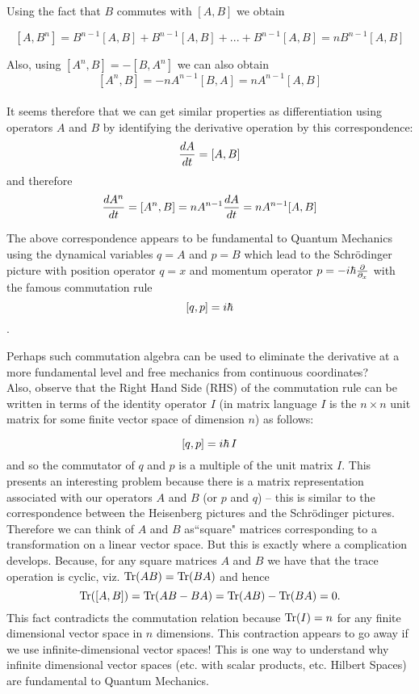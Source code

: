 Using the fact that $B$ commutes with $[A,B]$ we obtain

$$[A,B^n] = B^{n-1}[A,B] + B^{n-1}[A,B] + ...+ B^{n-1}[A,B] = nB^{n-1} [A,B]$$

Also, using $[A^n,B] = - [B,A^n]$ we can also obtain $$[A^n,B] = - nA^{n-1}[B,A] = nA^{n-1}[A,B]$$\\

It seems therefore that we can get similar properties as differentiation using operators $A$ and $B$ by identifying the 
derivative operation by this correspondence: $$ {dA\over dt} = [A,B]$$ and therefore $${dA^n\over dt} = [A^n,B] = nA^{n-1} {dA\over dt} = nA^{n-1} [A,B]$$

The above correspondence appears to be fundamental to Quantum Mechanics using the dynamical variables $q = A$ and $p = B$ which lead to the Schr\"odinger picture with position operator $q = x$ and momentum operator $p = -i\hbar {\partial\over \partial_x}$ with the famous commutation rule $$\large [q,p] = i\hbar$$.

Perhaps such commutation algebra can be used to eliminate the derivative at a more fundamental level and free mechanics from continuous coordinates? \\

Also, observe that the Right Hand Side (RHS) of the commutation rule can be written in terms of the identity operator $I$ (in matrix language $I$ is the $n \times n$ unit matrix for some finite vector space of dimension $n$) as follows:

$$\large [q,p] = i\hbar\, I$$ and so the commutator of $q$ and $p$ is a multiple of the unit matrix $I$. This presents an interesting problem because there is a matrix representation associated with our operators $A$ and $B$ (or $p$ and $q$) -- this is similar to the correspondence between the Heisenberg pictures and the Schr\"odinger pictures. Therefore we can think of $A$ and $B$ as``square" matrices corresponding to a transformation on a linear vector space. But this is exactly where a complication develops. Because, for any square matrices $A$ and $B$ we have that the trace operation is cyclic, viz. ${\rm Tr}(AB) = {\rm Tr}(BA)$ and hence $${\rm Tr}([A,B]) = {\rm Tr}(AB - BA) = {\rm Tr}(AB) - {\rm Tr}(BA) = 0.$$ This fact contradicts the commutation relation because ${\rm Tr}(I) = n$ for any finite dimensional vector space in $n$ dimensions. This contraction appears to go away if we use infinite-dimensional vector spaces! This is one way to understand why infinite dimensional vector spaces (etc. with scalar products, etc. Hilbert Spaces) are fundamental to Quantum Mechanics. \\

